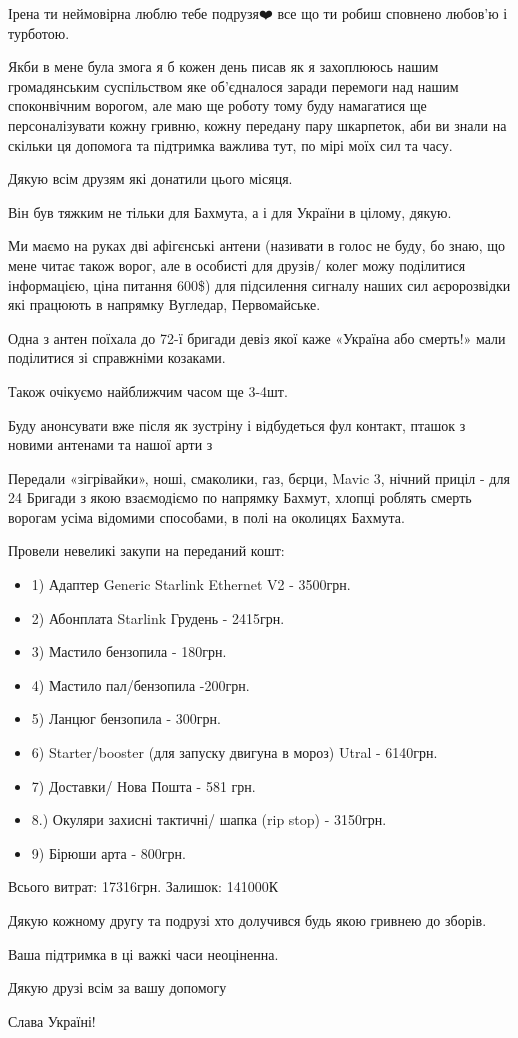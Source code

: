 Ірена ти неймовірна люблю тебе подрузя❤️ все що ти робиш сповнено любов’ю і
турботою.

Якби в мене була змога я б кожен день писав як я захоплююсь нашим громадянським
суспільством яке об’єдналося заради перемоги над нашим споконвічним ворогом,
але маю ще роботу тому буду намагатися ще персоналізувати кожну гривню, кожну
передану пару шкарпеток, аби ви знали на скільки ця допомога та підтримка
важлива тут, по мірі моїх сил та часу.

Дякую всім друзям які донатили цього місяця.

Він був тяжким не тільки для Бахмута, а і для України в цілому, дякую.

Ми маємо на руках дві афігєнські антени (називати в голос не буду, бо знаю, що
мене читає також ворог, але в особисті для друзів/ колег можу поділитися
інформацією, ціна питання 600\$) для підсилення сигналу наших сил аєророзвідки
які працюють в напрямку Вугледар, Первомайське.

Одна з антен поїхала до 72-ї бригади девіз якої каже «Україна або смерть!» мали поділитися зі справжніми козаками.

Також очікуємо найближчим часом ще 3-4шт. 

Буду анонсувати вже після як зустріну і відбудеться фул контакт, пташок з новими антенами та нашої арти з 🐓🔥  

Передали «зігрівайки», ноші, смаколики, газ, бєрци, Mavic 3, нічний приціл -
для 24 Бригади  з якою взаємодіємо по напрямку Бахмут, хлопці роблять смерть
ворогам усіма відомими способами, в полі на околицях Бахмута.  

Провели невеликі закупи на переданий кошт:

\begin{itemize}
  \item 1) Адаптер Generic Starlink Ethernet  V2 - 3500грн. 
  \item 2) Абонплата Starlink Грудень - 2415грн.
  \item 3) Мастило бензопила - 180грн.
  \item 4) Мастило пал/бензопила -200грн.
  \item 5) Ланцюг бензопила - 300грн. 
  \item 6) Starter/booster (для запуску двигуна в мороз) Utral - 6140грн. 
  \item 7) Доставки/ Нова Пошта -  581 грн.
  \item 8.) Окуляри захисні тактичні/ шапка (rip stop) -  3150грн. 
  \item 9) Бірюши арта  - 800грн. 
\end{itemize}

Всього витрат: 17316грн.
Залишок: 141000К

Дякую кожному другу та подрузі хто долучився будь якою гривнею до зборів.

Ваша підтримка в ці важкі часи неоціненна.

Дякую друзі всім за вашу допомогу💪🏻🇺🇦

Слава Україні!
